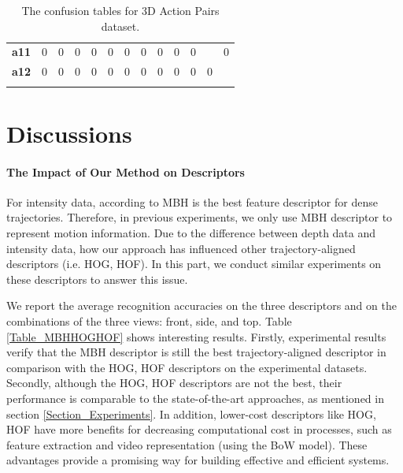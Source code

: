 \documentclass[final,3p,times,twocolumn]{elsarticle}
\begin{document}
\begin{table}[h]
{{\begin{tabular}{c|c|c|c|c|c|c|c|c|c|c|c|c|}
				\hhline{~------------}
			 {\bf a11} &          0 &          0 &          0 &          0 &          0 &          0 &          0 &          0 &          0 &          0 &       \color{white}{\bf 1.0}\cellcolor[gray]{.0}  &          0 \\
				\hhline{~------------}
			 {\bf a12} &          0 &          0 &          0 &          0 &          0 &          0 &          0 &          0 &          0 &          0 &          0 &       \color{white}{\bf 1.0}\cellcolor[gray]{.0}  \\
				\hhline{~------------}
			\end{tabular} 
		}
		}
	\caption{The confusion tables for 3D Action Pairs dataset.}
	\label{Table_ConfusionMatrices_3DActionPairs}
\end{table}

\section{Discussions}
\label{lbl:Discussions}

\paragraph{The Impact of Our Method on Descriptors}

For intensity data, according to \cite{wang2011densetraj} MBH is the best feature descriptor for dense trajectories. Therefore, in previous experiments, we only use MBH descriptor to represent motion information. Due to the difference between depth data and intensity data, how our approach has influenced other trajectory-aligned descriptors (i.e. HOG, HOF). In this part, we conduct similar experiments on these descriptors to answer this issue.

We report the average recognition accuracies on the three descriptors and on the combinations of the three views: front, side, and top. Table \ref{Table_MBHHOGHOF} shows interesting results.
Firstly, experimental results verify that the MBH descriptor is still the best trajectory-aligned descriptor in comparison with the HOG, HOF descriptors on the experimental datasets.
Secondly, although the HOG, HOF descriptors are not the best, their performance is comparable to the state-of-the-art approaches, as mentioned in section \ref{Section_Experiments}.
In addition, lower-cost descriptors like HOG, HOF have more benefits for decreasing computational cost in processes, such as feature extraction and video representation (using the BoW model).
These advantages provide a promising way for building effective and efficient systems.
\end{document}
